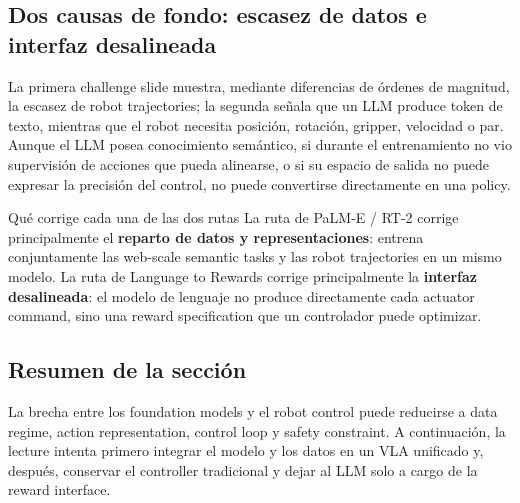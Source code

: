 

\subsection{Dos causas de fondo: escasez de datos e interfaz desalineada}

La primera challenge slide muestra, mediante diferencias de órdenes de magnitud, la escasez de robot trajectories; la segunda señala que un LLM produce token de texto, mientras que el robot necesita posición, rotación, gripper, velocidad o par. Aunque el LLM posea conocimiento semántico, si durante el entrenamiento no vio supervisión de acciones que pueda alinearse, o si su espacio de salida no puede expresar la precisión del control, no puede convertirse directamente en una policy.




\begin{knowledgebox}{Qué corrige cada una de las dos rutas}
La ruta de PaLM-E / RT-2 corrige principalmente el \textbf{reparto de datos y representaciones}: entrena conjuntamente las web-scale semantic tasks y las robot trajectories en un mismo modelo. La ruta de Language to Rewards corrige principalmente la \textbf{interfaz desalineada}: el modelo de lenguaje no produce directamente cada actuator command, sino una reward specification que un controlador puede optimizar.
\end{knowledgebox}

\subsection{Resumen de la sección}

La brecha entre los foundation models y el robot control puede reducirse a data regime, action representation, control loop y safety constraint. A continuación, la lecture intenta primero integrar el modelo y los datos en un VLA unificado y, después, conservar el controller tradicional y dejar al LLM solo a cargo de la reward interface.
